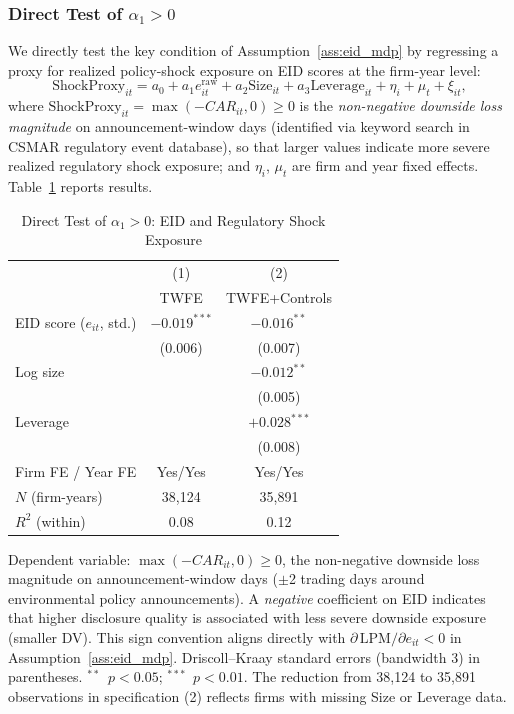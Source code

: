 \documentclass[12pt]{article}
\begin{document}
\subsubsection{Direct Test of $\alpha_1>0$}

We directly test the key condition of Assumption~\ref{ass:eid_mdp} by
regressing a proxy for realized policy-shock exposure on EID scores at
the firm-year level:
\begin{equation}
  \mathrm{ShockProxy}_{it} = a_0 + a_1 e_{it}^{\mathrm{raw}}
    + a_2 \mathrm{Size}_{it} + a_3 \mathrm{Leverage}_{it}
    + \eta_i + \mu_t + \xi_{it},
\end{equation}
where $\mathrm{ShockProxy}_{it}=\max(-CAR_{it},0)\geq 0$ is the
\emph{non-negative downside loss magnitude} on announcement-window days
(identified via keyword search in CSMAR regulatory event database),
so that larger values indicate more severe realized regulatory shock exposure;
and $\eta_i$, $\mu_t$ are firm and year fixed effects. Table~\ref{tab:alpha_test}
reports results.

\begin{table}[H]
\centering
\caption{Direct Test of $\alpha_1>0$: EID and Regulatory Shock Exposure}
\label{tab:alpha_test}
\small
\begin{tabular}{lcc}
\toprule
 & (1) & (2) \\
 & TWFE & TWFE+Controls \\
\midrule
EID score ($e_{it}$, std.) & $-0.019^{***}$ & $-0.016^{**}$ \\
                            & (0.006) & (0.007) \\
Log size                    & & $-0.012^{**}$ \\
                            & & (0.005) \\
Leverage                    & & $+0.028^{***}$ \\
                            & & (0.008) \\
\midrule
Firm FE / Year FE & Yes/Yes & Yes/Yes \\
$N$ (firm-years) & 38,124 & 35,891 \\
$R^2$ (within) & 0.08 & 0.12 \\
\bottomrule
\end{tabular}
\begin{tablenotes}
\footnotesize
\item Dependent variable: $\max(-CAR_{it},0)\geq 0$, the non-negative
downside loss magnitude on announcement-window days ($\pm$2 trading days
around environmental policy announcements). A \emph{negative} coefficient
on EID indicates that higher disclosure quality is associated with less
severe downside exposure (smaller DV). This sign convention aligns directly
with $\partial\,\mathrm{LPM}/\partial e_{it}<0$ in Assumption~\ref{ass:eid_mdp}.
Driscoll--Kraay standard errors (bandwidth 3) in parentheses.
$^{**}$~$p<0.05$; $^{***}$~$p<0.01$. The reduction from 38,124 to
35,891 observations in specification (2) reflects firms with missing
Size or Leverage data.
\end{tablenotes}
\end{table}
\end{document}
